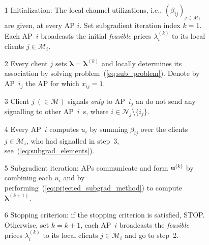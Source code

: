 \documentclass[journal, 10pt, twocolumn]{IEEEtran}
\renewcommand{\vec}[1]{\bf{#1}}     \newcommand{\vecsc}[1]{\mbox {\boldmath \scriptsize $#1$}}     \newcommand{\itvec}[1]{\mbox {\boldmath $#1$}}
\begin{document}
\begin{figure}[t]
\noindent {}
\begin{enumerate}
\scriptsize
\item[1] Initialization: The local channel utilizations, i.e., $(\beta_{ij})_{j\in\mathcal{M}_i}$ are given, at every AP $i$. Set subgradient iteration index $k=1$. Each AP~$i$ broadcasts the initial \emph{feasible} prices $\lambda^{(k)}_i$ to its local clients $j\in\mathcal{M}_i$.


\item[2] Every client $j$ sets $\boldsymbol\lambda=\boldsymbol\lambda^{(k)}$ and locally determines its association by solving problem~(\ref{eq:sub_problem}). Denote by AP~$i_j$ the AP for which $x_{ij}=1$. 

\item[3] Client $j~(\in\mathcal{M})$ signals \emph{only} to AP~$i_j$ an do not send any signalling to other AP~$i$~s, where $i\in\mathcal{N}_j \setminus \{i_j\}$.

\item[4] Every AP~$i$ computes $u_i$ by summing $\beta_{ij}$ over the clients~$j\in\mathcal{M}_i$, who had signalled in step~3, see~(\ref{eq:subgrad_elements}).

\item[5] Subgradient iteration: APs communicate and form ${\vec u}^{(k)}$ by combining each $u_i$ and by performing~(\ref{eq:prjected_subgrad_method}) to compute $\boldsymbol\lambda^{(k+1)}$.

\item[6] Stopping criterion: if the stopping criterion is satisfied, STOP. Otherwise, set $k=k+1$, each AP~$i$ broadcasts the \emph{feasible} prices $\lambda^{(k)}_i$ to its local clients $j\in\mathcal{M}_i$ and go to step~2.
\end{enumerate}
\vspace{-3mm}
\noindent\hrulefill\vspace{-6mm}
\end{figure}
\end{document}
